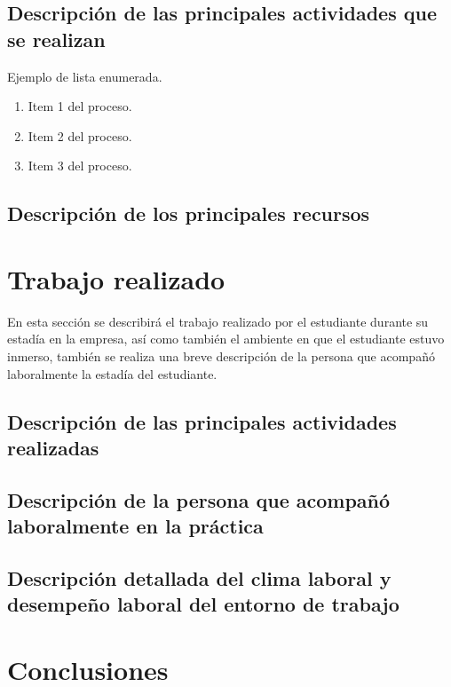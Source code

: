 \documentclass[12pt,letter,spanish]{article}
\begin{document}
\subsection{Descripción de las principales actividades que se realizan}
Ejemplo de lista enumerada.

\begin{enumerate}
    \item Item 1 del proceso.
    \item Item 2 del proceso.
    \item Item 3 del proceso.
\end{enumerate}



\subsection{Descripción de los principales recursos}




\newpage

\section{Trabajo realizado}%
En esta sección se describirá el trabajo realizado por el estudiante durante su estadía en la empresa, así como también el ambiente en que el estudiante estuvo inmerso, también se realiza una breve descripción de la persona que acompañó laboralmente la estadía del estudiante.
\subsection{Descripción de las principales actividades realizadas}
\subsection{Descripción de la persona que acompañó laboralmente en la práctica}
\subsection{Descripción detallada del clima laboral y desempeño laboral del entorno de trabajo}


\newpage

\section{Conclusiones}%
\end{document}
